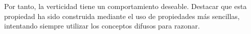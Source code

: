 Por tanto, la verticidad tiene un comportamiento deseable. Destacar que esta propiedad ha sido construida mediante el uso de propiedades más sencillas, intentando siempre utilizar los conceptos difusos para razonar.\\

